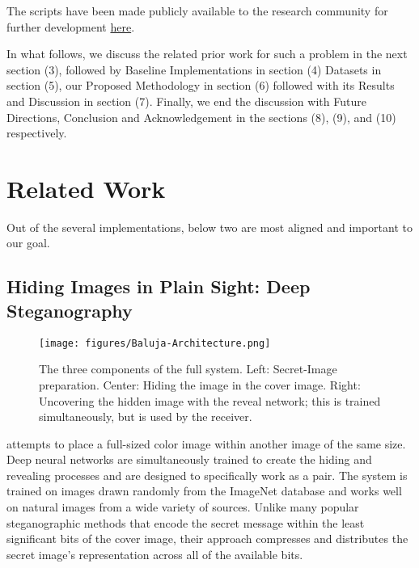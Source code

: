 \documentclass{article}
\begin{document}
The scripts have been made publicly available to the research community for further development
 \href{https://github.com/JapsimarSinghWahi/DeepSteganography}{here}.

In what follows, we discuss the related prior work for such a problem in the next section (3), followed by Baseline Implementations in section (4) Datasets in section (5), our Proposed Methodology in section (6) followed with its Results and Discussion in section (7). Finally, we end the discussion with Future Directions, Conclusion and Acknowledgement in the sections (8), (9), and (10) respectively.


\section{Related Work}

Out of the several implementations, below two are most aligned and important to our goal.

\subsection{Hiding Images in Plain Sight: Deep Steganography}

\begin{figure*}[t]
\vskip 0.2in
\begin{center}
\centerline{\texttt{[image: figures/Baluja-Architecture.png]}}
\caption{The three components of the full system. Left: Secret-Image preparation. Center: Hiding the image in the cover image. Right: Uncovering the hidden image with the reveal network; this is trained simultaneously, but is used by the receiver.}
\label{fig:baluja_arch}
\end{center}
\vskip -0.4in
\end{figure*}

 \cite{NIPS2017_6802} attempts to place a full-sized color image within another image of the same size. Deep neural networks are simultaneously trained to create the hiding and revealing processes and are designed to specifically work as a pair. The system is trained on images drawn randomly from the ImageNet database and works well on natural images from a wide variety of sources.  Unlike many popular steganographic methods that encode the secret message within the least significant bits of the cover image, their approach compresses and distributes the secret image’s representation across all of the available bits.
\end{document}
